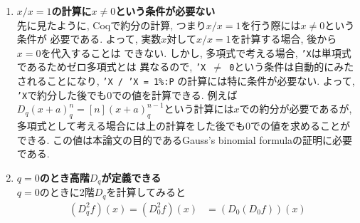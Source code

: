 \documentclass[11pt]{jsreport}
\theoremstyle{mystyle}
\newcommand{\0}{\textbf{0}}
\newcommand{\1}{\textbf{1}}
\newcommand{\2}{\textbf{2}}
\begin{document}
\begin{enumerate}
\item \textbf{$x / x = 1$の計算に$x \neq 0$という条件が必要ない}\\
  先に見たように, Coqで約分の計算, つまり$x / x = 1$を行う際には$x \ne 0$という条件が
  必要である. よって, 実数$x$対して$x / x = 1$を計算する場合, 後から$x = 0$を代入することは
  できない.   しかし, 多項式で考える場合, {\tt 'X}は単項式であるためゼロ多項式とは
  異なるので, {\tt 'X $\neq$ 0}という条件は自動的にみたされることになり, {\tt 'X / 'X = 1\%:P}
  の計算には特に条件が必要ない. よって, {\tt 'X}で約分した後でも$0$での値を計算できる.  
  例えば$D_q (x + a)^n_q = [n](x + a)^{n - 1}_q$という計算には$x$での約分が必要であるが, 
  多項式として考える場合には上の計算をした後でも$0$での値を求めることができる. 
  この値は本論文の目的であるGauss's binomial formulaの証明に必要である. 
%
%
\item \textbf{$q = 0$のとき高階$D_q$が定義できる}\\
	$q = 0$のときに2階$D_q$を計算してみると
	\begin{align*}
	  (D_q ^2 f) (x) = (D_0 ^2 f) (x) &= (D_0 (D_0 f)) (x) \\

\end{align*}
\end{enumerate}
\end{document}

